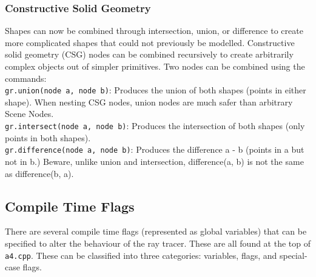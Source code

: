 \documentclass {article}
\begin{document}
\subsubsection{Constructive Solid Geometry}
Shapes can now be combined through intersection, union, or difference to create
more complicated shapes that could not previously be modelled.  Constructive
solid geometry (CSG) nodes can be combined recursively to create arbitrarily
complex objects out of simpler primitives.  Two nodes can be combined using the
commands:\\
\verb!gr.union(node a, node b)!: Produces the union of both shapes (points in
either shape).  When nesting CSG nodes, union nodes are much safer than
arbitrary Scene Nodes.\\
\verb!gr.intersect(node a, node b)!: Produces the intersection of both shapes
(only points in both shapes).\\
\verb!gr.difference(node a, node b)!: Produces the difference a - b (points
in a but not in b.)  Beware, unlike union and intersection, difference(a, b) is
not the same as difference(b, a).\\

\subsection{Compile Time Flags}
There are several compile time flags (represented as global variables) that can
be specified to alter the behaviour of the ray tracer.  These are all found at
the top of \verb!a4.cpp!.  These can be classified into three categories:
variables, flags, and special-case flags.
\end{document}
